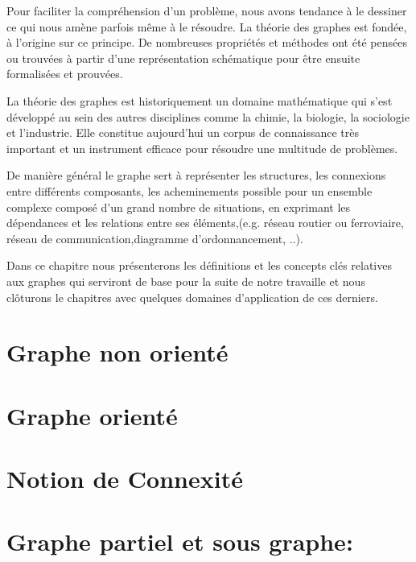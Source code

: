Pour faciliter la compréhension d’un problème, nous avons tendance à  le dessiner ce qui nous amène parfois même à le résoudre. La théorie des graphes est fondée, à l’origine sur ce principe. De nombreuses propriétés et méthodes ont été pensées ou trouvées à partir d’une représentation schématique pour être ensuite formalisées et prouvées.


La théorie des graphes est historiquement un domaine mathématique qui s’est développé  au sein des autres disciplines comme la chimie, la biologie, la sociologie et l'industrie. Elle constitue aujourd'hui un corpus de connaissance très important et un instrument efficace pour résoudre une multitude de problèmes.


De manière général le graphe sert à représenter les structures, les connexions entre différents composants, les acheminements possible pour un ensemble complexe composé d'un grand nombre de situations, en exprimant les dépendances et les relations entre ses éléments,(e.g. réseau routier ou ferroviaire, réseau de communication,diagramme d'ordonnancement, ..). 


Dans ce chapitre nous présenterons les définitions et les concepts clés relatives aux graphes qui serviront de base pour la suite de notre travaille et nous clôturons le chapitres avec quelques domaines d'application de ces derniers.

	
	\section{Graphe non orienté}
		
			
	\section{Graphe orienté}	
		
		
	\section{Notion de Connexité}
	
	
	
	
	
	\section{Graphe partiel et sous graphe:}
    				
	
